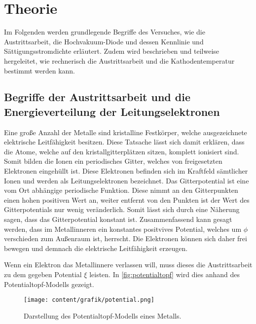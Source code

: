 \section{Theorie}
\label{sec:theorie}

Im Folgenden werden grundlegende Begriffe des Versuches, wie die Austrittsarbeit, die Hochvakuum-Diode und dessen Kennlinie und Sättigungsstromdichte erläutert.
Zudem wird beschrieben und teilweise hergeleitet, wie rechnerisch die Austrittsarbeit und die Kathodentemperatur bestimmt werden kann.

\subsection{Begriffe der Austrittsarbeit und die Energieverteilung der Leitungselektronen}
\label{sec:Begriffe der Austrittsarbeit und die Energieverteilung der Leitungselektronen}

Eine große Anzahl der Metalle sind kristalline Festkörper, welche ausgezeichnete elektrische Leitfähigkeit besitzen.
Diese Tatsache lässt sich damit erklären, dass die Atome, welche auf den kristallgitterplätzen sitzen, komplett ionisiert sind.
Somit bilden die Ionen ein periodisches Gitter, welches von freigesetzten Elektronen eingehüllt ist.
Diese Elektronen befinden sich im Kraftfeld sämtlicher Ionen und werden als Leitungselektronen bezeichnet.
Das Gitterpotential ist eine vom Ort abhängige periodische Funktion. Diese nimmt an den Gitterpunkten einen hohen positiven Wert an,
weiter entfernt von den Punkten ist der Wert des Gitterpotentials nur wenig veränderlich. Somit lässt sich durch eine
Näherung sagen, dass das Gitterpotential konstant ist. Zusammenfassend kann gesagt werden, dass im Metallinneren ein konstantes 
positvives Potential, welches um $\phi$ verschieden zum Außenraum ist, herrscht. Die Elektronen können sich daher 
frei bewegen und demnach die elektrische Leitfähigkeit erzeugen.

Wenn ein Elektron das Metallinnere verlassen will, muss dieses die Austrittsarbeit zu dem gegeben Potential $\xi$ leisten.
In \autoref{fig:potentialtopf} wird dies anhand des Potentialtopf-Modells gezeigt.
\begin{figure}[H]
    \centering
    \texttt{[image: content/grafik/potential.png]}
    \caption{Darstellung des Potentialtopf-Modells eines Metalls.\cite{elektron}}
    \label{fig:potentialtopf}
\end{figure}

